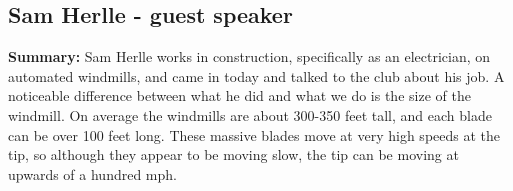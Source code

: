 
\subsection{Sam Herlle - guest speaker}


\textbf{Summary:} Sam Herlle works in construction, specifically as an electrician, on automated windmills, and came in today and talked to the club about his job. A noticeable difference between what he did and what we do is the size of the windmill. On average the windmills are about 300-350 feet tall, and each blade can be over 100 feet long. These massive blades move at very high speeds at the tip, so although they appear to be moving slow, the tip can be moving at upwards of a hundred mph.

